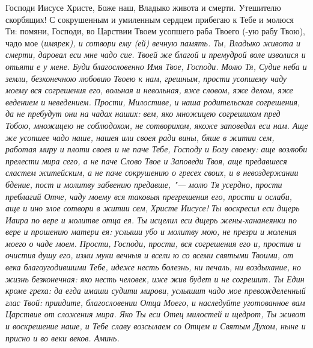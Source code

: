 Господи Иисусе Христе, Боже наш, Владыко живота и смерти. Утешителю скорбящих! С сокрушенным и умиленным сердцем прибегаю к Тебе и молюся Ти: помяни, Господи, во Царствии Твоем усопшего раба Твоего (-ую рабу Твою), чадо мое (\itshape имярек\normalfont{}), и сотвори ему (ей) вечную память. Ты, Владыко живота и смерти, даровал еси мне чадо сие. Твоей же благой и премудрой воле изволися и отьяти е у мене. Буди благословенно Имя Твое, Господи. Молю Тя, Судие неба и земли, безконечною любовию Твоею к нам, грешным, прости усопшему чаду моему вся согрешения его, вольная и невольная, яже словом, яже делом, яже ведением и неведением. Прости, Милостиве, и наша родительская согрешения, да не пребудут они на чадах наших: вем, яко множицею согрешихом пред Тобою, множицею не соблюдохом, не сотворихом, якоже заповедал еси нам. Аще же усопшее чадо наше, нашея или своея ради вины, бяше в житии сем, работая миру и плоти своея и не паче Тебе, Господу и Богу своему: аще возлюби прелести мира сего, а не паче Слово Твое и Заповеди Твоя, аще предавшеся сластем житейским, а не паче сокрушению о гресех своих, и в невоздержании бдение, пост и молитву забвению предавше, "--- молю Тя усердно, прости преблагий Отче, чаду моему вся таковыя прегрешения его, прости и ослаби, аще и ино злое сотвори в житии сем, Христе Иисусе! Ты воскресил еси дщерь Иаира по вере и молитве отца ея. Ты исцелил еси дщерь жены-хананеянки по вере и прошению матери ея: услыши убо и молитву мою, не презри и моления моего о чаде моем. Прости, Господи, прости, вся согрешения его и, простив и очистив душу его, изми муки вечныя и всели ю со всеми святыми Твоими, от века благоугодившими Тебе, идеже несть болезнь, ни печаль, ни воздыхание, но жизнь безконечная: яко несть человек, иже жив будет и не согрешит. Ты Един кроме греха: да егда имаши судити мирови, услышит чадо мое превожделенный глас Твой: приидите, благословении Отца Моего, и наследуйте уготованное вам Царствие от сложения мира. Яко Ты еси Отец милостей и щедрот, Ты живот и воскрешение наше, и Тебе славу возсылаем со Отцем и Святым Духом, ныне и присно и во веки веков. Аминь. 





\mychapterending

 


